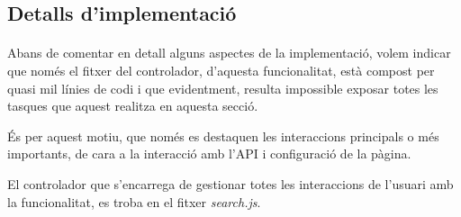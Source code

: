 \subsection{Detalls d'implementació}

    \paragraph{}
    Abans de comentar en detall alguns aspectes de la implementació, volem indicar que només el fitxer del controlador, d'aquesta funcionalitat, està compost per quasi mil línies de codi i que evidentment, resulta impossible exposar totes les tasques que aquest realitza en aquesta secció.

    És per aquest motiu, que només es destaquen les interaccions principals o més importants, de cara a la interacció amb l'API i configuració de la pàgina.

    El controlador que s'encarrega de gestionar totes les interaccions de l'usuari amb la funcionalitat, es troba en el fitxer \emph{search.js}.

    
    
    
    

